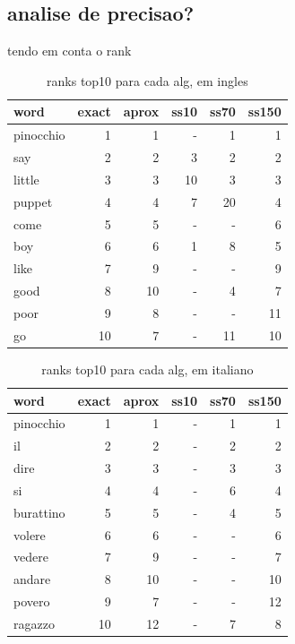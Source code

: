 \documentclass[mirror, portugues]{revdetua}
\begin{document}
\subsection{analise de precisao?}

tendo em conta o rank

\begin{table}[H]
\centering
\caption{ranks top10 para cada alg, em ingles}
\label{table:rank10_ing}
\begin{tabular}{lrrrrr}
\toprule
word & exact & aprox & ss10 & ss70 & ss150 \\
\midrule
pinocchio & 1 & 1 & - & 1 & 1 \\
say & 2 & 2 & 3 & 2 & 2 \\
little & 3 & 3 & 10 & 3 & 3 \\
puppet & 4 & 4 & 7 & 20 & 4 \\
come & 5 & 5 & - & - & 6 \\
boy & 6 & 6 & 1 & 8 & 5 \\
like & 7 & 9 & - & - & 9 \\
good & 8 & 10 & - & 4 & 7 \\
poor & 9 & 8 & - & - & 11 \\
go & 10 & 7 & - & 11 & 10 \\
\bottomrule
\end{tabular}
\end{table}

\begin{table}[H]
\centering
\caption{ranks top10 para cada alg, em italiano}
\label{table:rank10_it}
\begin{tabular}{lrrrrr}
\toprule
word & exact & aprox & ss10 & ss70 & ss150 \\
\midrule
pinocchio & 1 & 1 & - & 1 & 1 \\
il & 2 & 2 & - & 2 & 2 \\
dire & 3 & 3 & - & 3 & 3 \\
si & 4 & 4 & - & 6 & 4 \\
burattino & 5 & 5 & - & 4 & 5 \\
volere & 6 & 6 & - & - & 6 \\
vedere & 7 & 9 & - & - & 7 \\
andare & 8 & 10 & - & - & 10 \\
povero & 9 & 7 & - & - & 12 \\
ragazzo & 10 & 12 & - & 7 & 8 \\
\bottomrule
\end{tabular}
\end{table}
\end{document}
